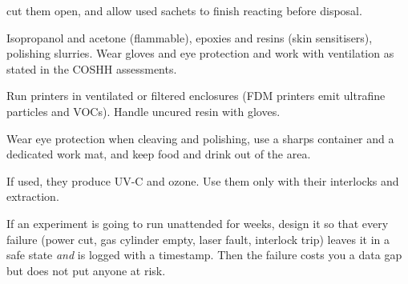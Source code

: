 \begin{description}[style=nextline,leftmargin=1.2em,itemsep=3pt]
        cut them open, and allow used sachets to finish reacting before disposal.
  \item[Chemicals] Isopropanol and acetone (flammable), epoxies and resins (skin sensitisers),
        polishing slurries. Wear gloves and eye protection and work with ventilation as stated in the
        COSHH assessments.
  \item[3D printing] Run printers in ventilated or filtered enclosures (FDM printers emit ultrafine
        particles and VOCs). Handle uncured resin with gloves.
  \item[Fibre shards] Wear eye protection when cleaving and polishing, use a sharps container and
        a dedicated work mat, and keep food and drink out of the area.
  \item[Plasma and UV/ozone cleaners] If used, they produce UV-C and ozone. Use them only with their
        interlocks and extraction.
\end{description}

\begin{safetybox}
If an experiment is going to run unattended for weeks, design it so that every failure (power cut, gas
cylinder empty, laser fault, interlock trip) leaves it in a safe state \emph{and} is logged with a
timestamp. Then the failure costs you a data gap but does not put anyone at risk.
\end{safetybox}
